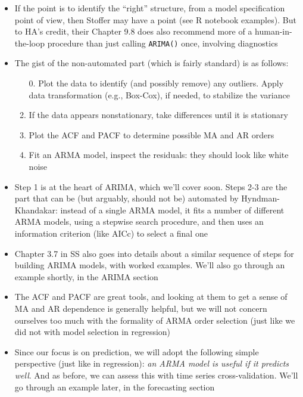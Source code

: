 \documentclass{article}
\begin{document}
\begin{itemize}
\item If the point is to identify the ``right'' structure, from a model
  specification point of view, then Stoffer may have a point (see R notebook 
  examples). But to HA's credit, their Chapter 9.8 does also recommend more of a  
  human-in-the-loop procedure than just calling \verb|ARIMA()| once, involving 
  diagnostics

\item The gist of the non-automated part (which is fairly standard) is as
  follows: 
  \begin{enumerate}
  \item[0.] Plot the data to identify (and possibly remove) any outliers. 
   Apply data transformation (e.g., Box-Cox), if needed, to stabilize the
   variance   
  \item If the data appears nonstationary, take differences until it is
    stationary 
  \item Plot the ACF and PACF to determine possible MA and AR orders 
  \item Fit an ARMA model, inspect the residuals: they should look like white 
    noise 
  \end{enumerate}

\item Step 1 is at the heart of ARIMA, which we'll cover soon. Steps 2-3 are the
  part that can be (but arguably, should not be) automated by Hyndman-Khandakar:  
  instead of a single ARMA model, it fits a number of different ARMA models,
  using a stepwise search procedure, and then uses an information criterion
  (like AICc) to select a final one 

\item Chapter 3.7 in SS also goes into details about a similar sequence of steps
  for building ARIMA models, with worked examples. We'll also go through an
  example shortly, in the ARIMA section 

\item The ACF and PACF are great tools, and looking at them to get a sense of MA
  and AR dependence is generally helpful, but we will not concern ourselves too
  much with the formality of ARMA order selection (just like we did not with
  model selection in regression) 

\item Since our focus is on prediction, we will adopt the following simple
  perspective (just like in regression): \emph{an ARMA model is useful if it
    predicts well}. And as before, we can assess this with time series
  cross-validation. We'll go through an example later, in the forecasting
  section   
\end{itemize}
\end{document}

